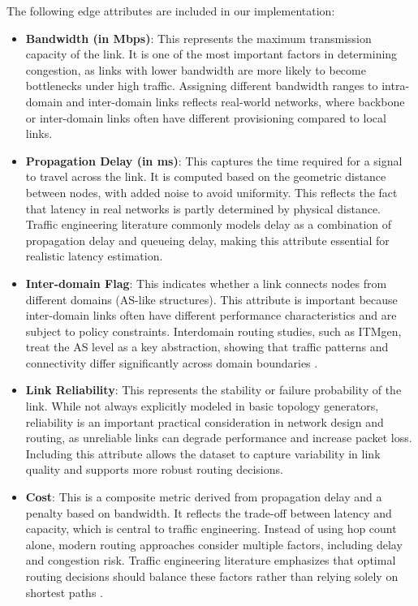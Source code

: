 \documentclass[12pt]{article}
\begin{document}
The following edge attributes are included in our implementation:
\begin{itemize}
    \item \textbf{Bandwidth (in Mbps)}: This represents the maximum transmission capacity of the link. It is one of the most important factors in determining congestion, as links with lower bandwidth are more likely to become bottlenecks under high traffic. Assigning different bandwidth ranges to intra-domain and inter-domain links reflects real-world networks, where backbone or inter-domain links often have different provisioning compared to local links.
    \item \textbf{Propagation Delay (in ms)}: This captures the time required for a signal to travel across the link. It is computed based on the geometric distance between nodes, with added noise to avoid uniformity. This reflects the fact that latency in real networks is partly determined by physical distance. Traffic engineering literature commonly models delay as a combination of propagation delay and queueing delay, making this attribute essential for realistic latency estimation.
    \item \textbf{Inter-domain Flag}: This indicates whether a link connects nodes from different domains (AS-like structures). This attribute is important because inter-domain links often have different performance characteristics and are subject to policy constraints. Interdomain routing studies, such as ITMgen, treat the AS level as a key abstraction, showing that traffic patterns and connectivity differ significantly across domain boundaries \cite{itmgen}.
    \item \textbf{Link Reliability}: This represents the stability or failure probability of the link. While not always explicitly modeled in basic topology generators, reliability is an important practical consideration in network design and routing, as unreliable links can degrade performance and increase packet loss. Including this attribute allows the dataset to capture variability in link quality and supports more robust routing decisions.
    \item \textbf{Cost}: This is a composite metric derived from propagation delay and a penalty based on bandwidth. It reflects the trade-off between latency and capacity, which is central to traffic engineering. Instead of using hop count alone, modern routing approaches consider multiple factors, including delay and congestion risk. Traffic engineering literature emphasizes that optimal routing decisions should balance these factors rather than relying solely on shortest paths \cite{internetTrafficMatrices}.
\end{itemize}
\end{document}

